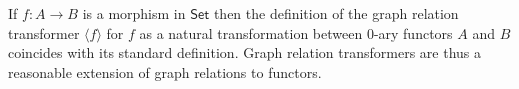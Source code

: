 \documentclass[runningheads]{llncs}
\newcommand{\set}{\mathsf{Set}}
\renewcommand{\id}{\mathit{id}}
\renewcommand{\id}{\mathit{id}}
\begin{document}
If $f : A \to B$ is a morphism in $\set$ then the definition of the
graph relation transformer $\langle f \rangle$ for $f$ as a natural
transformation between $0$-ary functors $A$ and $B$ coincides with its
standard definition.  Graph relation transformers are thus a
reasonable extension of graph relations to functors.
\begin{comment}

\vspace*{0.2in}
  
If $f : A \to B$ is a function with graph relation $\graph{f} = (A, B,
\graph{f}^*)$, then $\langle \id_{A}, f \rangle : A \to A \times B$
and $\langle \id_{A}, f \rangle\, A = \graph{f}^*$.  Moreover, if
$\iota_{\graph{f}} : \graph{f}^* \hookrightarrow A \times B$ is the
inclusion of $\graph{f}^*$ into $A \times B$ then there is an
isomorphism of subobjects
\[\begin{tikzcd}
A \ar[rr, "{\cong}"] \ar[dr, "{\langle \id_{A}, f \rangle}"']
&&{\graph{f}^*} \ar[dl, "{\iota_{\graph{f}}}"]\\
&A \times B
\end{tikzcd}\]

We also note that if $f : A \to B$ is a function seen as a natural
transformation between 0-ary functors, then $\graph{f}$ is (the 0-ary
relation transformer associated with) the graph relation of $f$.
Indeed, we need to apply Definition~\ref{definition:graph-nat-transf} with $k
= 0$, i.e., to the degenerate relation $\ast : \rel(\ast, \ast)$.  As
degenerate $0$-ary functors, $A$ and $B$ are constant functors, i.e.,
$A\, \ast = A$ and $B\, \ast = B$.  By the universal property of the
product, there exists a unique $h$ making the diagram
\[ \begin{tikzcd}[row sep = large]
        A
        &A
        \ar[l, equal]
        \ar[r, equal]
        \ar[d, dashed, "{h}"]
        &A
        \ar[r, "{f}"]
        &B \\
        &A \times B
        \ar[ul, "{\pi_1}"] \ar[urr, "{\pi_2}"']
\end{tikzcd}\]
commute. Since $\iota_\ast : \ast \to \ast$ is the identity on $\ast$,
and $A\, \id_{\ast} = \id_{A}$, we have $h_{\ast} = h$.  Moreover,
$h_{\overline{A \times B}} = \langle \id_{A}, f \rangle$ is a
monomorphism in $\set$ because $\id_{A}$ is.  Then,
$\iota_{f^\wedge\ast} = \langle \id_{A}, f \rangle$ and $f^\wedge\ast
= A$, from which we deduce that $\iota_{f^\wedge\ast} f^\wedge\ast =
\langle \id_{A}, f \rangle\, A = \graph{f}^*$. This ensures that the
graph of $f$ as a 0-ary natural transformation coincides with the
graph of $f$ as a morphism in $\set$, and so that
Definition~\ref{dfn:graph-nat-transf} is a reasonable generalization
of Definition~\ref{def:graph}.


\end{comment}
\end{document}
